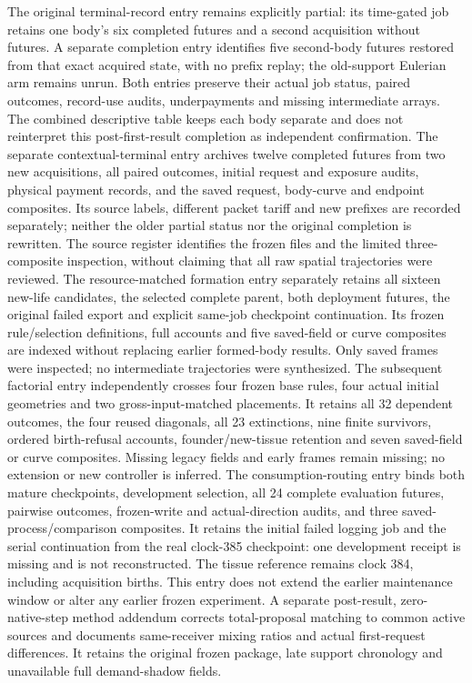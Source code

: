 The original terminal-record entry remains explicitly partial: its time-gated job retains one body's six completed futures and a second acquisition without futures. A separate completion entry identifies five second-body futures restored from that exact acquired state, with no prefix replay; the old-support Eulerian arm remains unrun. Both entries preserve their actual job status, paired outcomes, record-use audits, underpayments and missing intermediate arrays. The combined descriptive table keeps each body separate and does not reinterpret this post-first-result completion as independent confirmation. The separate contextual-terminal entry archives twelve completed futures from two new acquisitions, all paired outcomes, initial request and exposure audits, physical payment records, and the saved request, body-curve and endpoint composites. Its source labels, different packet tariff and new prefixes are recorded separately; neither the older partial status nor the original completion is rewritten. The source register identifies the frozen files and the limited three-composite inspection, without claiming that all raw spatial trajectories were reviewed.
The resource-matched formation entry separately retains all sixteen new-life candidates, the selected complete parent, both deployment futures, the original failed export and explicit same-job checkpoint continuation. Its frozen rule/selection definitions, full accounts and five saved-field or curve composites are indexed without replacing earlier formed-body results. Only saved frames were inspected; no intermediate trajectories were synthesized. The subsequent factorial entry independently crosses four frozen base rules, four actual initial geometries and two gross-input-matched placements. It retains all 32 dependent outcomes, the four reused diagonals, all 23 extinctions, nine finite survivors, ordered birth-refusal accounts, founder/new-tissue retention and seven saved-field or curve composites. Missing legacy fields and early frames remain missing; no extension or new controller is inferred.
The consumption-routing entry binds both mature checkpoints, development selection, all 24 complete evaluation futures, pairwise outcomes, frozen-write and actual-direction audits, and three saved-process/comparison composites. It retains the initial failed logging job and the serial continuation from the real clock-385 checkpoint: one development receipt is missing and is not reconstructed. The tissue reference remains clock 384, including acquisition births. This entry does not extend the earlier maintenance window or alter any earlier frozen experiment. A separate post-result, zero-native-step method addendum corrects total-proposal matching to common active sources and documents same-receiver mixing ratios and actual first-request differences. It retains the original frozen package, late support chronology and unavailable full demand-shadow fields.
